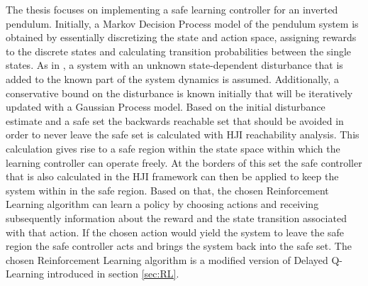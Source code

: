 \documentclass[../main.tex]{subfiles}
\begin{document}
The thesis focuses on implementing a safe learning controller for an inverted pendulum. Initially, a Markov Decision Process model of the pendulum system is obtained by essentially discretizing the state and action space, assigning rewards to the discrete states and calculating transition probabilities between the single states. As in \cite{akametalu2014reachability}, a system with an unknown state-dependent disturbance that is added to the known part of the system dynamics is assumed. Additionally, a conservative bound on the disturbance is known initially that will be iteratively updated with a Gaussian Process model. Based on the initial disturbance estimate and a safe set the backwards reachable set that should be avoided in order to never leave the safe set is calculated with HJI reachability analysis. This calculation gives rise to a safe region within the state space within which the learning controller can operate freely. At the borders of this set the safe controller that is also calculated in the HJI framework can then be applied to keep the system within in the safe region. Based on that, the chosen Reinforcement Learning algorithm can learn a policy by choosing actions and receiving subsequently information about the reward and the state transition associated with that action. If the chosen action would yield the system to leave the safe region the safe controller acts and brings the system back into the safe set. The chosen Reinforcement Learning algorithm is a modified version of Delayed Q-Learning introduced in section \ref{sec:RL}.
\end{document}
